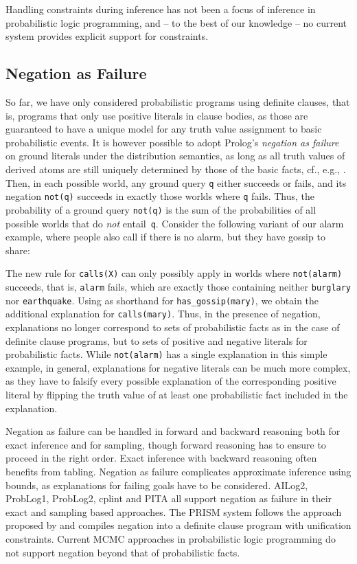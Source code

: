 \documentclass[a4paper]{article}
\begin{document}
Handling constraints during inference has not been a focus of
inference in probabilistic logic programming, and  -- to the best of
our knowledge -- no current system provides explicit support for
constraints. 




\subsection{Negation as Failure} \label{sec:naf}
So far, we have only considered probabilistic programs using definite
clauses, that is, programs that only use positive literals in clause
bodies, as those are guaranteed to have a unique model for any truth
value assignment to basic probabilistic events. It is however possible
to adopt Prolog's \emph{negation as  failure} on ground literals under
the distribution semantics, as long as all truth values of derived
atoms are still uniquely determined by those of the basic facts, 
cf., e.g.,
\citep{Poole00,sato:ijcai05,KimmigSRL09,Riguzzi09,Fierens13}. Then, in
each possible world, any ground query \verb|q| either succeeds or
fails, and its negation \verb|not(q)|  succeeds in exactly those
worlds where \verb|q| fails. Thus, the
probability of a ground query \verb|not(q)| is the sum of the
probabilities of all possible worlds that do \emph{not}
entail~\verb|q|. 
Consider the following variant of our alarm example, where people also
call if there is no alarm, but they have gossip to share:

The new rule for \verb|calls(X)| can only possibly apply in worlds where
\verb|not(alarm)| succeeds, that is, \verb|alarm| fails, which are
exactly those containing neither \verb|burglary| nor
\verb|earthquake|. Using  as shorthand for
\verb|has_gossip(mary)|, we obtain the additional explanation  for
\verb|calls(mary)|. Thus, in the presence of negation, explanations no
longer correspond to sets of probabilistic facts as in the case of
definite clause programs, but to sets of positive and negative
literals for probabilistic facts. 
While \verb|not(alarm)| has a single explanation
in this simple example, in general, explanations for negative literals
can be much more complex, as they have to falsify every possible
explanation of the corresponding positive literal by flipping the
truth value of at least one probabilistic fact included in the
explanation. 



Negation as failure can be handled in forward and backward reasoning
both for exact inference and for sampling, though forward reasoning has to ensure to proceed in
the right order. Exact inference with backward reasoning often
benefits from tabling. Negation as failure complicates approximate
inference using bounds, as explanations for failing goals have to be
considered. AILog2, ProbLog1, ProbLog2, cplint and PITA all support
negation as failure in their exact and sampling based approaches. The PRISM system follows the approach proposed by
\cite{sato:ijcai05} and compiles negation into a definite clause
program with unification constraints. Current MCMC approaches in probabilistic logic
programming do not support negation beyond that of probabilistic facts. 
\end{document}
